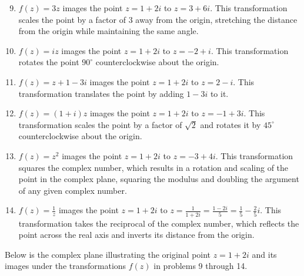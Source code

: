 \documentclass{article}
\begin{document}
\begin{enumerate}\setcounter{enumi}{8}
        \item $f(z) = 3z$ images the point $z = 1 + 2i$ to $z = 3+6i$. This transformation scales the point by a factor of 3 away from the origin,  stretching the distance from the origin while maintaining the same angle.
        \item $f(z) = iz$ images the point $z = 1 + 2i$ to $z = -2 + i$. This transformation rotates the point $90^\circ$ counterclockwise about the origin.
        \item $f(z) = z + 1 - 3i$ images the point $z = 1 + 2i$ to $z = 2 - i$. This transformation translates the point by adding $1 - 3i$ to it.
        \item $f(z) = (1+i)z$ images the point $z = 1 + 2i$ to $z = -1 + 3i$. This transformation scales the point by a factor of $\sqrt{2}$ and rotates it by $45^\circ$ counterclockwise about the origin.
        \item $f(z) = z^2$ images the point $z = 1 + 2i$ to $z = -3 + 4i$. This transformation squares the complex number, which results in a rotation and scaling of the point in the complex plane, squaring the modulus and doubling the argument of any given complex number.
        \item $f(z) = \frac{1}{z}$ images the point $z = 1 + 2i$ to $z = \frac{1}{1 + 2i} = \frac{1 - 2i}{5} = \frac{1}{5} - \frac{2}{5}i$. This transformation takes the reciprocal of the complex number, which reflects the point across the real axis and inverts its distance from the origin.
    \end{enumerate}
    \newpage
\vspace{5mm}
\noindent Below is the complex plane illustrating the original point $z = 1+2i$ and its images under the transformations $f(z)$ in problems 9 through 14. 

\vspace{10mm}
\end{document}

